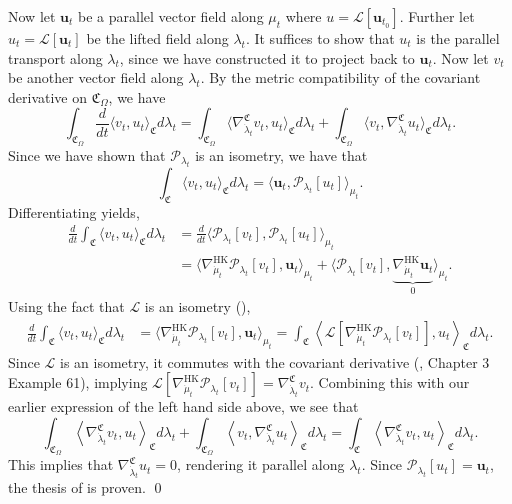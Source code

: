 \documentclass[11pt]{article}
\begin{document}
Now let $\mathbf{u}_t$ be a parallel vector field along $\mu_t$  where $u = \mathcal{L}[\mathbf{u}_{t_0}]$. Further let $u_t = \mathcal{L}[\mathbf{u}_t]$ be the lifted field along $\lambda_t$. It suffices to show that $u_t$ is the parallel transport along $\lambda_t$, since we have constructed it to project back to $\mathbf{u}_t$. Now let $v_t$ be another vector field along $\lambda_t$. By the metric compatibility of the covariant derivative on $\mathfrak{C}_\Omega$, we have
\[\int_{\mathfrak{C}_\Omega}\frac{d}{dt} \langle v_t, u_t\rangle_{\mathfrak{C}} d\lambda_t = \int_{\mathfrak{C}_\Omega}\langle \nabla^\mathfrak{C}_{\dot \lambda_t} v_t,  u_t\rangle_{\mathfrak{C}} d\lambda_t + \int_{\mathfrak{C}_\Omega} \langle v_t, \nabla^\mathfrak{C}_{\dot \lambda_t}u_t\rangle_{\mathfrak{C}} d\lambda_t.\]
Since we have shown that $\mathcal{P}_{\lambda_t}$ is an isometry, we have that 
\[\int_{\mathfrak{C}}\langle v_t, u_t \rangle_\mathfrak{C} d\lambda_t  = \langle \mathbf{u}_t, \mathcal{P}_{\lambda_t}[u_t] \rangle_{\mu_t}.\]
Differentiating yields,
\begin{align*}
\frac{d}{dt}\int_{\mathfrak{C}}\langle v_t, u_t \rangle_\mathfrak{C} d\lambda_t  &= \frac{d}{dt}\langle \mathcal{P}_{\lambda_t}[v_t], \mathcal{P}_{\lambda_t}[u_t] \rangle_{\mu_t} \\
&= \langle \nabla_{\dot \mu_t}^{\text{HK}}\mathcal{P}_{\lambda_t}[v_t], \mathbf{u}_t \rangle_{\mu_t} + \langle \mathcal{P}_{\lambda_t}[v_t], \underbrace{\nabla_{\dot \mu_t}^{\text{HK}}\mathbf{u}_t}_{0} \rangle_{\mu_t}.
\end{align*}
Using the fact that $\mathcal{L}$ is an isometry (),
\begin{align*}
\frac{d}{dt}\int_{\mathfrak{C}}\langle v_t, u_t \rangle_\mathfrak{C} d\lambda_t  &= \langle \nabla_{\dot \mu_t}^{\text{HK}}\mathcal{P}_{\lambda_t}[v_t], \mathbf{u}_t \rangle_{\mu_t} = \int_{\mathfrak{C}}\left\langle \mathcal{L}[\nabla_{\dot \mu_t}^{\text{HK}}\mathcal{P}_{\lambda_t}[v_t]], u_t \right\rangle_{\mathfrak{C}} d\lambda_t.
\end{align*}
Since $\mathcal{L}$ is an isometry, it commutes with the covariant derivative (\citet{o1983semi}, Chapter 3 Example 61), implying $\mathcal{L}[\nabla_{\dot \mu_t}^{\text{HK}}\mathcal{P}_{\lambda_t}[v_t]] = \nabla_{\dot\lambda_t}^{\mathfrak{C}}v_t$. Combining this with our earlier expression of the left hand side above, we see that 
\[\int_{\mathfrak{C}_\Omega}\left\langle \nabla^\mathfrak{C}_{\dot \lambda_t} v_t,  u_t\right\rangle_{\mathfrak{C}} d\lambda_t + \int_{\mathfrak{C}_\Omega} \left\langle v_t, \nabla^\mathfrak{C}_{\dot \lambda_t}u_t\right\rangle_{\mathfrak{C}} d\lambda_t = \int_{\mathfrak{C}}\left\langle \nabla_{\dot\lambda_t}^{\mathfrak{C}}v_t, u_t \right\rangle_{\mathfrak{C}} d\lambda_t.\]
This implies that $\nabla^\mathfrak{C}_{\dot \lambda_t}u_t = 0$, rendering it parallel along $\lambda_t$. Since $\mathcal{P}_{\lambda_t}[u_t] = \mathbf{u}_t$, the thesis of  is proven. \qed{}
\end{document}
